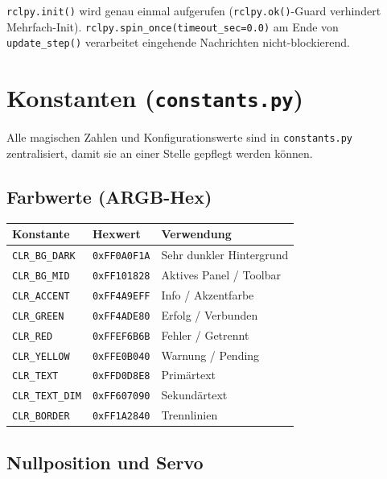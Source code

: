 \documentclass[11pt,a4paper]{article}
\begin{document}
\texttt{rclpy.init()} wird genau einmal aufgerufen
(\texttt{rclpy.ok()}-Guard verhindert Mehrfach-Init).
\texttt{rclpy.spin\_once(timeout\_sec=0.0)} am Ende von
\texttt{update\_step()} verarbeitet eingehende Nachrichten
nicht-blockierend.

\section{Konstanten (\texttt{constants.py})}
\label{sec:konstanten}

Alle magischen Zahlen und Konfigurationswerte sind in
\texttt{constants.py} zentralisiert, damit sie an einer Stelle
gepflegt werden können.

\subsection{Farbwerte (ARGB-Hex)}

\begin{center}
\begin{tabular}{lll}
  \toprule
  Konstante & Hexwert & Verwendung \\
  \midrule
  \texttt{CLR\_BG\_DARK}  & \texttt{0xFF0A0F1A} & Sehr dunkler Hintergrund \\
  \texttt{CLR\_BG\_MID}   & \texttt{0xFF101828} & Aktives Panel / Toolbar \\
  \texttt{CLR\_ACCENT}    & \texttt{0xFF4A9EFF} & Info / Akzentfarbe \\
  \texttt{CLR\_GREEN}     & \texttt{0xFF4ADE80} & Erfolg / Verbunden \\
  \texttt{CLR\_RED}       & \texttt{0xFFEF6B6B} & Fehler / Getrennt \\
  \texttt{CLR\_YELLOW}    & \texttt{0xFFE0B040} & Warnung / Pending \\
  \texttt{CLR\_TEXT}      & \texttt{0xFFD0D8E8} & Primärtext \\
  \texttt{CLR\_TEXT\_DIM} & \texttt{0xFF607090} & Sekundärtext \\
  \texttt{CLR\_BORDER}    & \texttt{0xFF1A2840} & Trennlinien \\
  \bottomrule
\end{tabular}
\end{center}

\subsection{Nullposition und Servo}
\end{document}
